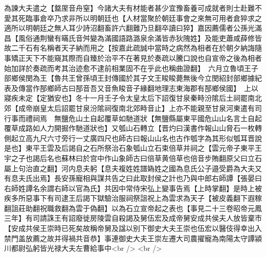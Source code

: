 為諫大夫遣之【盩厔音舟窒】今諸大夫有材能者甚少宜豫畜養可成就者則士赴難不愛其死臨事倉卒乃求非所以明朝廷也【人材當聚於朝廷事會之來無可用者倉猝求之適所以明朝廷之無人耳少詩沼翻畜許六翻難乃旦翻卒讀曰猝】嘉因薦儒者公孫光滿昌【風俗通荆蠻有暪氏音舛變為滿國語路潞泉余滿皆赤狄隗姓】及能吏蕭咸薛修皆故二千石有名稱者天子納而用之【按嘉此疏誠中當時之病然為相者在於朝夕納誨隨事矯正天下不能窺其際而自臻於治平不在著見於奏疏以騰口說也自宣帝之後為相者始加詳於奏疏而考其治迹愈不逮前相業固不在乎此也稱曲證翻】　六月立魯頃王子部鄉侯閔為王【魯共王曾孫頃王封傳國於其子文王睃睃薨無後今立閔紹封部鄉據紀表及傳當作郚鄉師古曰郚音吾又音魚睃音子緣翻地理志東海郡有郚鄉侯國】　上以寢疾未定【定猶安也】冬十一月壬子令太皇太后下詔復甘泉秦畤汾隂后土祠罷南北郊【成帝崩皇太后詔罷甘泉汾隂祠復南北郊畤音止】上亦不能親至甘泉河東遣有司行事而禮祠焉　無鹽危山土自起覆草如馳道狀【無鹽縣屬東平國危山山名言土自起覆草成路如人力開掘作馳道狀也】又瓠山石轉立【晋灼曰漢書作報山山脅石一枚轉側起立高九尺六寸旁行一丈廣四尺也師古曰報山山名也古作瓠字為其形似瓠耳晋說是也】東平王雲及后謁自之石所祭治石象瓠山立石束倍草并祠之【雲元帝子東平王宇之子也謁后名也蘇林曰於宫中作山象師古曰倍草黄倍草也倍音步賄翻原父曰立石屬上句治直之翻】河内息夫躬【息夫複姓姓譜媯姓之國為息氏公子邉受爵為大夫又有息夫氏出焉】長安孫寵相與謀共告之曰此取封侯之計也乃與中郎右師譚【張晏曰右師姓譚名余謂右師以官為氏】共因中常侍宋弘上變事告焉【上時掌翻】是時上被疾多所惡事下有司逮王后謁下獄驗治服祠祭詛祝上為雲求為天子【被皮義翻下遐稼翻詛莊助翻祝職救翻為雲于偽翻】以為石立宣帝起之表也【事見二十三卷昭帝元鳳三年】有司請誅王有詔廢徙房陵雲自殺謁及舅伍宏及成帝舅安成共侯夫人放皆棄市【安成共侯王崇時已死矣故稱帝舅及諡以别下御史大夫王崇也伍宏以醫伎得幸出入禁門盖放薦之故并得禍共音恭】事連御史大夫王崇左遷大司農擢寵為南陽太守譚潁川都尉弘躬皆光禄大夫左曹給事中<br />
<br />
